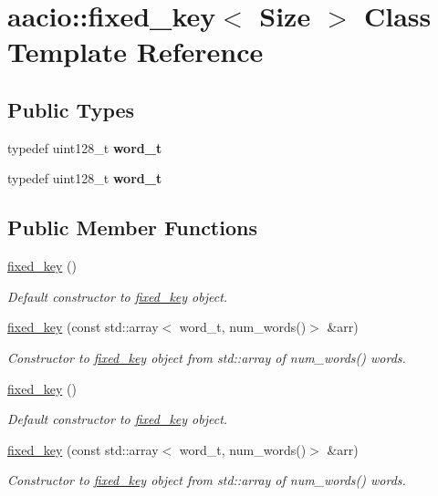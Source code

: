 \hypertarget{classaacio_1_1fixed__key}{}\section{aacio\+:\+:fixed\+\_\+key$<$ Size $>$ Class Template Reference}
\label{classaacio_1_1fixed__key}
\subsection*{Public Types}
\begin{DoxyCompactItemize}
\item 
\mbox{\label{classaacio_1_1fixed__key_aa33df89cbe59d01237706451e046425a}} 
typedef uint128\+\_\+t {\bfseries word\+\_\+t}
\item 
\mbox{\label{classaacio_1_1fixed__key_aa33df89cbe59d01237706451e046425a}} 
typedef uint128\+\_\+t {\bfseries word\+\_\+t}
\end{DoxyCompactItemize}
\subsection*{Public Member Functions}
\begin{DoxyCompactItemize}
\item 
\mbox{\hyperlink{classaacio_1_1fixed__key_a08beebc009535d8dd7390841d0582ee6}{fixed\+\_\+key}} ()
\begin{DoxyCompactList}\small\item\em Default constructor to \mbox{\hyperlink{classaacio_1_1fixed__key}{fixed\+\_\+key}} object. \end{DoxyCompactList}\item 
\mbox{\hyperlink{classaacio_1_1fixed__key_a8b7e40b2f57b0d95ed19e32a52b6abd9}{fixed\+\_\+key}} (const std\+::array$<$ word\+\_\+t, num\+\_\+words()$>$ \&arr)
\begin{DoxyCompactList}\small\item\em Constructor to \mbox{\hyperlink{classaacio_1_1fixed__key}{fixed\+\_\+key}} object from std\+::array of num\+\_\+words() words. \end{DoxyCompactList}\item 
\mbox{\hyperlink{classaacio_1_1fixed__key_a08beebc009535d8dd7390841d0582ee6}{fixed\+\_\+key}} ()
\begin{DoxyCompactList}\small\item\em Default constructor to \mbox{\hyperlink{classaacio_1_1fixed__key}{fixed\+\_\+key}} object. \end{DoxyCompactList}\item 
\mbox{\hyperlink{classaacio_1_1fixed__key_a8b7e40b2f57b0d95ed19e32a52b6abd9}{fixed\+\_\+key}} (const std\+::array$<$ word\+\_\+t, num\+\_\+words()$>$ \&arr)
\begin{DoxyCompactList}\small\item\em Constructor to \mbox{\hyperlink{classaacio_1_1fixed__key}{fixed\+\_\+key}} object from std\+::array of num\+\_\+words() words. \end{DoxyCompactList}\end{DoxyCompactItemize}
